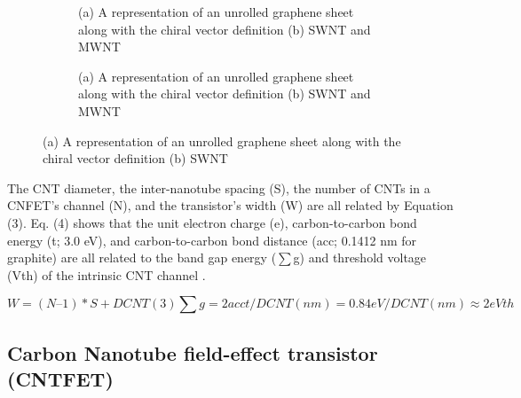 \begin{figure}[htbp]
  \centering
  \begin{subfigure}[b]{0.48\linewidth}
    \centering
    \caption{(a) A representation of an unrolled graphene sheet along with the chiral vector definition (b) SWNT and MWNT}

  \end{subfigure}
  \hfill
  \begin{subfigure}[b]{0.48\linewidth}
    \centering
    \caption{(a) A representation of an unrolled graphene sheet along with the chiral vector definition (b) SWNT and MWNT}

  \end{subfigure}
  \caption{(a) A representation of an unrolled graphene sheet along with the chiral vector definition (b) SWNT}

  \label{fig:group_3e5ag}
\end{figure}

The CNT diameter, the inter-nanotube spacing (S), the number of CNTs in a
CNFET's channel (N), and the transistor's width (W) are all related by Equation
(3). Eq. (4) shows that the unit electron charge (e), carbon-to-carbon bond
energy (t; 3.0 eV), and carbon-to-carbon bond distance (acc; 0.1412 nm for
graphite) are all related to the band gap energy ($\sum$g) and threshold voltage
(Vth) of the intrinsic CNT channel \cite{ref7}.

\begin{equation}
  W = (N – 1)*S + DCNT                                                                                                            (3)
  ∑g = 2acct / DCNT(nm) = 0.84eV / DCNT(nm) ≈ 2eVth
  \label{eq:4}
\end{equation}

\subsection*{Carbon Nanotube field-effect transistor (CNTFET)}


